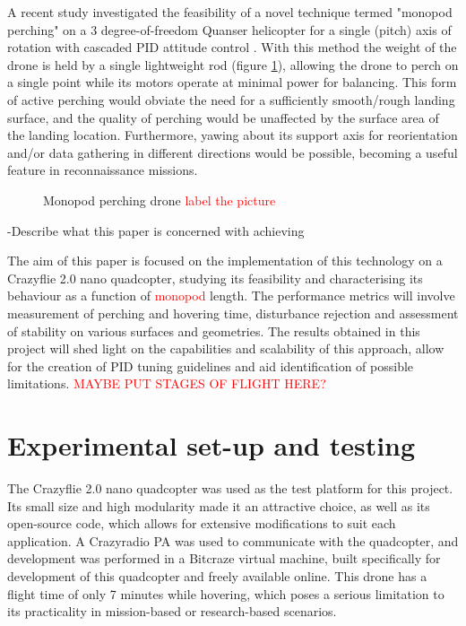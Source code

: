 \documentclass[12pt,a4paper]{article}
\begin{document}
A recent study investigated the feasibility of a novel technique termed "monopod perching" on a 3 degree-of-freedom Quanser helicopter for a single (pitch) axis of rotation with cascaded PID attitude control \cite{Hao}. With this method the weight of the drone is held by a single lightweight rod (figure \ref{fig1}), allowing the drone to perch on a single point while its motors operate at minimal power for balancing. This form of active perching would obviate the need for a sufficiently smooth/rough landing surface, and the quality of perching would be unaffected by the surface area of the landing location. Furthermore, yawing about its support axis for reorientation and/or data gathering in different directions would be possible, becoming a useful feature in reconnaissance missions.

\begin{figure}[h!]
\centering
  \caption{Monopod perching drone \textcolor{red}{label the picture}}
  \label{fig1}
\end{figure}


-Describe what this paper is concerned with achieving


The aim of this paper is focused on the implementation of this technology on a Crazyflie 2.0 nano quadcopter, studying its feasibility and characterising its behaviour as a function of \textcolor{red}{monopod} length. The performance metrics will involve measurement of perching and hovering time, disturbance rejection and assessment of stability on various surfaces and geometries. The results obtained in this project will shed light on the capabilities and scalability of this approach, allow for the creation of PID tuning guidelines and aid identification of possible limitations. \textcolor{red}{MAYBE PUT STAGES OF FLIGHT HERE?}




\section{Experimental set-up and testing}
The Crazyflie 2.0 nano quadcopter was used as the test platform for this project. Its small size and high modularity made it an attractive choice, as well as its open-source code, which allows for extensive modifications to suit each application. A Crazyradio PA was used to communicate with the quadcopter, and development was performed in a Bitcraze virtual machine, built specifically for development of this quadcopter and freely available online. This drone has a flight time of only 7 minutes while hovering, which poses a serious limitation to its practicality in mission-based or research-based scenarios.
	
\end{document}
